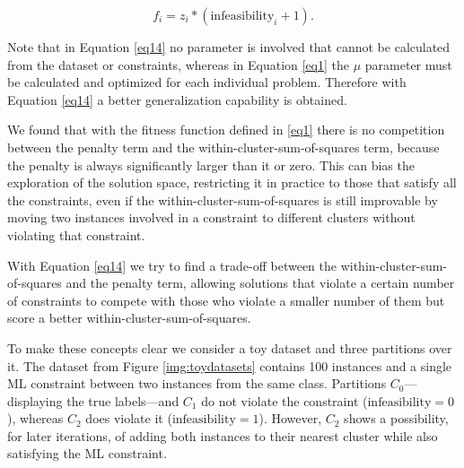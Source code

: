 \documentclass[review]{elsarticle}
\begin{document}
\begin{equation}
f_i = z_i * (\text{infeasibility}_i + 1).
\label{eq14}
\end{equation}

Note that in Equation \eqref{eq14} no parameter is involved that cannot be calculated from the dataset or constraints, whereas in Equation \eqref{eq1} the $\mu$ parameter must be calculated and optimized for each individual problem. Therefore with Equation \eqref{eq14} a better generalization capability is obtained.

We found that with the fitness function defined in \eqref{eq1} there is no competition between the penalty term and the within-cluster-sum-of-squares term, because the penalty is always significantly larger than it or zero. This can bias the exploration of the solution space, restricting it in practice to those that satisfy all the constraints, even if the within-cluster-sum-of-squares is still improvable by moving two instances involved in a constraint to different clusters without violating that constraint.

With Equation \eqref{eq14} we try to find a trade-off between the within-cluster-sum-of-squares and the penalty term, allowing solutions that violate a certain number of constraints to compete with those who violate a smaller number of them but score a better within-cluster-sum-of-squares.

To make these concepts clear we consider a toy dataset and three partitions over it. The dataset from Figure \ref{img:toydatasets} contains 100 instances and a single ML constraint between two instances from the same class. Partitions $C_0$---displaying the true labels---and $C_1$ do not violate the constraint ($\text{infeasibility} = 0$), whereas $C_2$ does violate it ($\text{infeasibility} = 1$). However, $C_2$ shows a possibility, for later iterations, of adding both instances to their nearest cluster while also satisfying the ML constraint.
\end{document}
